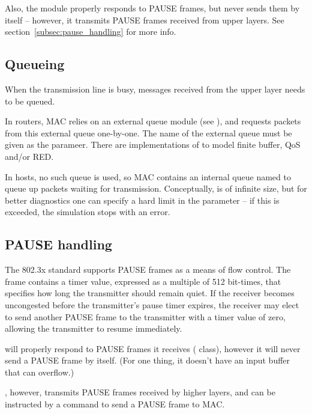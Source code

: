 Also, the module properly responds to PAUSE frames, but never sends them
by itself -- however, it transmits PAUSE frames received from upper layers.
See section~\ref{subsec:pause_handling} for more info.

\subsection*{Queueing}

When the transmission line is busy, messages received from the upper layer
needs to be queued.

In routers, MAC relies on an external queue module (see ),
and requests packets from this external queue one-by-one. The name of the
external queue must be given as the  parameer.
There are implementations of  to model finite buffer,
QoS and/or RED.

In hosts, no such queue is used, so MAC contains an internal
queue named  to queue up packets waiting for transmission.
Conceptually,  is of infinite size, but for better diagnostics
one can specify a hard limit in the  parameter -- if this is
exceeded, the simulation stops with an error.

\subsection*{PAUSE handling}
\label{subsec:pause_handling}

The 802.3x standard supports PAUSE frames as a means of flow
control. The frame contains a timer value, expressed as a multiple
of 512 bit-times, that specifies how long the transmitter should
remain quiet. If the receiver becomes uncongested before the
transmitter's pause timer expires, the receiver may elect to send
another PAUSE frame to the transmitter with a timer value of zero,
allowing the transmitter to resume immediately.

 will properly respond to PAUSE frames it receives
( class),
however it will never send a PAUSE frame by itself. (For one thing,
it doesn't have an input buffer that can overflow.)

, however, transmits PAUSE frames received by higher layers,
and  can be instructed by a command to send a PAUSE frame to MAC.


